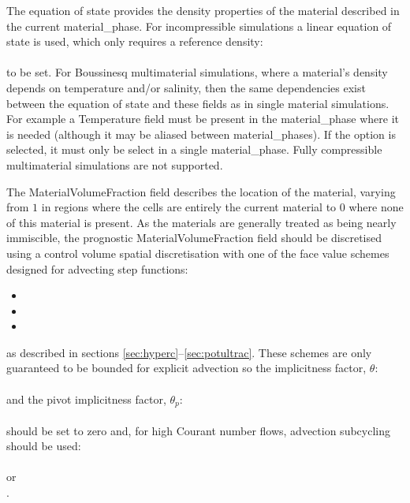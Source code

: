 The equation of state provides the density properties of the material described in the current material\_phase.  For incompressible simulations a linear equation of state is used, which only requires a reference density:\\
\\
to be set.  For Boussinesq multimaterial simulations, where a material's density depends on temperature and/or salinity, then the same dependencies exist between the equation of state and these fields as in single material simulations.  For example a Temperature field must be present in the material\_phase where it is needed (although it may be aliased between material\_phases).  If the  option is selected, it must only be select in a single material\_phase.  Fully compressible multimaterial simulations are not supported.

The MaterialVolumeFraction field describes the location of the material, varying from $1$ in regions where the cells are entirely the current material to $0$ where none of this material is present.  As the materials are generally treated as being nearly immiscible, the prognostic MaterialVolumeFraction field should be discretised using a control volume spatial discretisation with one of the face value schemes designed for advecting step functions:
\begin{itemize}
\item {}
\item {}
\item {}
\end{itemize}
as described in sections \ref{sec:hyperc}--\ref{sec:potultrac}.  These schemes are only guaranteed to be bounded for explicit advection so the implicitness factor, $\theta$:\\
\\
and the pivot implicitness factor, $\theta_p$:\\
\\
should be set to zero and, for high Courant number flows, advection subcycling should be used:\\
\\
or\\
.

